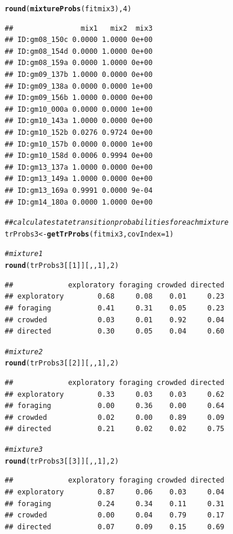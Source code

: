 \documentclass[12pt]{article}\usepackage[]{graphicx}\usepackage[]{xcolor}
\makeatletter
\newcommand{\hlnum}[1]{\textcolor[rgb]{0.686,0.059,0.569}{#1}}%
\newcommand{\hlcom}[1]{\textcolor[rgb]{0.678,0.584,0.686}{\textit{#1}}}%
\newcommand{\hldef}[1]{\textcolor[rgb]{0.345,0.345,0.345}{#1}}%
\newcommand{\hlkwb}[1]{\textcolor[rgb]{0.69,0.353,0.396}{#1}}%
\newcommand{\hlkwc}[1]{\textcolor[rgb]{0.333,0.667,0.333}{#1}}%
\newcommand{\hlkwd}[1]{\textcolor[rgb]{0.737,0.353,0.396}{\textbf{#1}}}%
\newenvironment{kframe}{%
 \def\at@end@of@kframe{}%
 \ifinner\ifhmode%
  \def\at@end@of@kframe{\end{minipage}}%
  \begin{minipage}{\columnwidth}%
 \fi\fi%
 \def\FrameCommand##1{\hskip\@totalleftmargin \hskip-\fboxsep
 \colorbox{shadecolor}{##1}\hskip-\fboxsep
     \hskip-\linewidth \hskip-\@totalleftmargin \hskip\columnwidth}%
 \MakeFramed {\advance\hsize-\width
   \@totalleftmargin\z@ \linewidth\hsize
   \@setminipage}}%
 {\par\unskip\endMakeFramed%
 \at@end@of@kframe}
\newenvironment{knitrout}{}{} %
\makeatother
\begin{document}
\begin{knitrout}
\color{fgcolor}\begin{kframe}
\begin{alltt}
\hlkwd{round}\hldef{(}\hlkwd{mixtureProbs}\hldef{(fitmix3),}\hlnum{4}\hldef{)}
\end{alltt}
\begin{verbatim}
##                mix1   mix2  mix3
## ID:gm08_150c 0.0000 1.0000 0e+00
## ID:gm08_154d 0.0000 1.0000 0e+00
## ID:gm08_159a 0.0000 1.0000 0e+00
## ID:gm09_137b 1.0000 0.0000 0e+00
## ID:gm09_138a 0.0000 0.0000 1e+00
## ID:gm09_156b 1.0000 0.0000 0e+00
## ID:gm10_000a 0.0000 0.0000 1e+00
## ID:gm10_143a 1.0000 0.0000 0e+00
## ID:gm10_152b 0.0276 0.9724 0e+00
## ID:gm10_157b 0.0000 0.0000 1e+00
## ID:gm10_158d 0.0006 0.9994 0e+00
## ID:gm13_137a 1.0000 0.0000 0e+00
## ID:gm13_149a 1.0000 0.0000 0e+00
## ID:gm13_169a 0.9991 0.0000 9e-04
## ID:gm14_180a 0.0000 1.0000 0e+00
\end{verbatim}
\begin{alltt}
\hlcom{## calculate state transition probabilities for each mixture}
\hldef{trProbs3} \hlkwb{<-} \hlkwd{getTrProbs}\hldef{(fitmix3,} \hlkwc{covIndex}\hldef{=}\hlnum{1}\hldef{)}

\hlcom{# mixture 1}
\hlkwd{round}\hldef{(trProbs3[[}\hlnum{1}\hldef{]][,,}\hlnum{1}\hldef{],}\hlnum{2}\hldef{)}
\end{alltt}
\begin{verbatim}
##             exploratory foraging crowded directed
## exploratory        0.68     0.08    0.01     0.23
## foraging           0.41     0.31    0.05     0.23
## crowded            0.03     0.01    0.92     0.04
## directed           0.30     0.05    0.04     0.60
\end{verbatim}
\begin{alltt}
\hlcom{# mixture 2}
\hlkwd{round}\hldef{(trProbs3[[}\hlnum{2}\hldef{]][,,}\hlnum{1}\hldef{],}\hlnum{2}\hldef{)}
\end{alltt}
\begin{verbatim}
##             exploratory foraging crowded directed
## exploratory        0.33     0.03    0.03     0.62
## foraging           0.00     0.36    0.00     0.64
## crowded            0.02     0.00    0.89     0.09
## directed           0.21     0.02    0.02     0.75
\end{verbatim}
\begin{alltt}
\hlcom{# mixture 3}
\hlkwd{round}\hldef{(trProbs3[[}\hlnum{3}\hldef{]][,,}\hlnum{1}\hldef{],}\hlnum{2}\hldef{)}
\end{alltt}
\begin{verbatim}
##             exploratory foraging crowded directed
## exploratory        0.87     0.06    0.03     0.04
## foraging           0.24     0.34    0.11     0.31
## crowded            0.00     0.04    0.79     0.17
## directed           0.07     0.09    0.15     0.69
\end{verbatim}
\end{kframe}
\end{knitrout}
\end{document}
